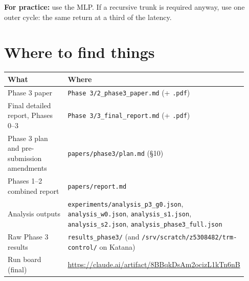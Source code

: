 \documentclass[11pt]{article}
\begin{document}
\textbf{For practice:} use the MLP. If a recursive trunk is required anyway, use one outer cycle: the same return at a third of the latency.



\medskip



\section*{Where to find things}



\begin{center}\small\begin{tabular}{>{\raggedright\arraybackslash}p{0.310\linewidth}>{\raggedright\arraybackslash}p{0.624\linewidth}}
\toprule
What & Where \\
\midrule
Phase 3 paper & \texttt{Phase 3/\allowbreak{}2\_\allowbreak{}phase3\_\allowbreak{}paper.\allowbreak{}md} (+ \texttt{.pdf}) \\
Final detailed report, Phases 0--3 & \texttt{Phase 3/\allowbreak{}3\_\allowbreak{}final\_\allowbreak{}report.\allowbreak{}md} (+ \texttt{.pdf}) \\
Phase 3 plan and pre-submission amendments & \texttt{papers/\allowbreak{}phase3/\allowbreak{}plan.\allowbreak{}md} (\S{}10) \\
Phases 1--2 combined report & \texttt{papers/\allowbreak{}report.\allowbreak{}md} \\
Analysis outputs & \texttt{experiments/\allowbreak{}analysis\_\allowbreak{}p3\_\allowbreak{}g0.\allowbreak{}json}, \texttt{analysis\_\allowbreak{}w0.\allowbreak{}json}, \texttt{analysis\_\allowbreak{}s1.\allowbreak{}json}, \texttt{analysis\_\allowbreak{}s2.\allowbreak{}json}, \texttt{analysis\_\allowbreak{}phase3\_\allowbreak{}full.\allowbreak{}json} \\
Raw Phase 3 results & \texttt{results\_\allowbreak{}phase3/\allowbreak{}} (and \texttt{/\allowbreak{}srv/\allowbreak{}scratch/\allowbreak{}z5308482/\allowbreak{}trm-control/\allowbreak{}} on Katana) \\
Run board (final) & \url{https://claude.ai/artifact/8BBqkDsAm2ocizL1kTn6nB} \\
\bottomrule
\end{tabular}\end{center}
\end{document}

